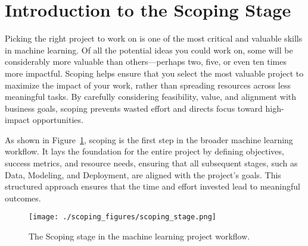 \documentclass[12pt,openany]{book}
\begin{document}
\section*{Introduction to the Scoping Stage}

Picking the right project to work on is one of the most critical and valuable skills in machine learning. Of all the potential ideas you could work on, some will be considerably more valuable than others—perhaps two, five, or even ten times more impactful. Scoping helps ensure that you select the most valuable project to maximize the impact of your work, rather than spreading resources across less meaningful tasks. By carefully considering feasibility, value, and alignment with business goals, scoping prevents wasted effort and directs focus toward high-impact opportunities. \newline

As shown in Figure~\ref{fig:scoping_stage}, scoping is the first step in the broader machine learning workflow. It lays the foundation for the entire project by defining objectives, success metrics, and resource needs, ensuring that all subsequent stages, such as Data, Modeling, and Deployment, are aligned with the project’s goals. This structured approach ensures that the time and effort invested lead to meaningful outcomes.


\begin{figure}[htbp]
    \centering
    \texttt{[image: ./scoping\_figures/scoping\_stage.png]}
    \caption{The Scoping stage in the machine learning project workflow.}
    \label{fig:scoping_stage}
\end{figure}
\end{document}
